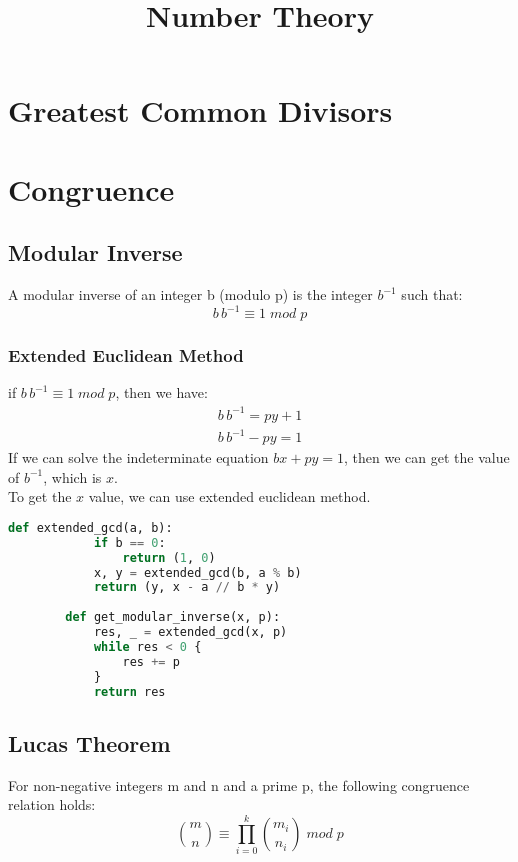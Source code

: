 \documentclass{article}
\title{Number Theory}
\date{}
\begin{document}
\maketitle

\section{Greatest Common Divisors}

\section{Congruence}
  \subsection{Modular Inverse}
    A modular inverse of an integer b (modulo p) is the integer $ b^{-1} $ such that:
      $$ b \, b^{-1} \equiv 1 \; mod \; p $$
    \subsubsection{Extended Euclidean Method}
      if $ b \, b^{-1} \equiv 1 \; mod \; p $, then we have:
      \begin{align*}
        b \, b^{-1} = py + 1 \\
        b \, b^{-1} - py = 1 
      \end{align*}
      If we can solve the indeterminate equation $ bx + py = 1 $, then we can get the value of $ b^{-1} $, which is $ x $. \\
      To get the $ x $ value, we can use extended euclidean method.
      \begin{lstlisting}[language=Python, basicstyle=\small]
        def extended_gcd(a, b):
            if b == 0:
                return (1, 0)
            x, y = extended_gcd(b, a % b)
            return (y, x - a // b * y)
        
        def get_modular_inverse(x, p):
            res, _ = extended_gcd(x, p)
            while res < 0 {
                res += p
            }
            return res
      \end{lstlisting}

  \subsection{Lucas Theorem}
    For non-negative integers m and n and a prime p, the following congruence relation holds:
    \begin{equation*}
      \binom{m}{n} \equiv \prod_{i = 0}^{k} \binom{m_i}{n_i} \; mod \; p
    \end{equation*}
    
\end{document}
